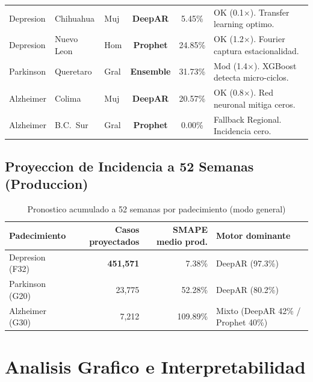 \documentclass[12pt, letterpaper]{article}
\begin{document}
\begin{table}[H]
\begin{tabularx}{\textwidth}{l l l >{\bfseries}c c X}
Depresion & Chihuahua  & Muj  & \textcolor{cdeepar}{DeepAR}    & 5.45\%  & OK (0.1$\times$). Transfer learning optimo. \\
Depresion & Nuevo Leon & Hom  & \textcolor{cprophet}{Prophet}   & 24.85\% & OK (1.2$\times$). Fourier captura estacionalidad. \\
Parkinson & Queretaro  & Gral & \textcolor{censemble}{Ensemble} & 31.73\% & Mod (1.4$\times$). XGBoost detecta micro-ciclos. \\
Alzheimer & Colima     & Muj  & \textcolor{cdeepar}{DeepAR}    & 20.57\% & OK (0.8$\times$). Red neuronal mitiga ceros. \\
Alzheimer & B.C.\ Sur  & Gral & \textcolor{cprophet}{Prophet}   & 0.00\%  & \textcolor{burgundy}{Fallback Regional.} Incidencia cero. \\
\bottomrule
\end{tabularx}
\end{table}

\subsection{Proyeccion de Incidencia a 52 Semanas (Produccion)}

\begin{table}[H]
\centering
\caption{Pronostico acumulado a 52 semanas por padecimiento (modo general)}
\label{tab:forecast52}
\small
\begin{tabular}{lrrl}
\toprule
\textbf{Padecimiento} & \textbf{Casos proyectados} & \textbf{SMAPE medio prod.} & \textbf{Motor dominante} \\
\midrule
Depresion (F32) & \textbf{451,571} & 7.38\%   & DeepAR (97.3\%) \\
Parkinson (G20) & 23,775           & 52.28\%  & DeepAR (80.2\%) \\
Alzheimer (G30) & 7,212            & 109.89\% & Mixto (DeepAR 42\% / Prophet 40\%) \\
\bottomrule
\end{tabular}
\end{table}

\newpage

\section{Analisis Grafico e Interpretabilidad}\label{sec:graficos}
\end{document}
